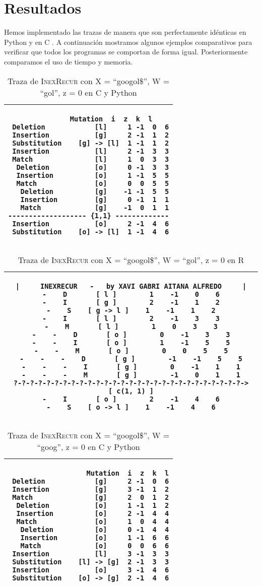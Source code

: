 \documentclass{article}
\newcommand{\tempcaption}{}
\newenvironment{code}[4]{
\begin{table}[h!]
\gdef\tempcaption{Traza de \textsc{InexRecur} con X = ``#1'', W = ``#2'', z = #3 en #4}
\centering
\begin{tabular}{|c|}
\hline }
{\\\hline
\end{tabular}
\caption{\tempcaption}
\end{table} }
\newcommand{\C}{C }
\newcommand{\R}{R }
\newcommand{\python}{Python }
\begin{document}
\section{Resultados}

Hemos implementado las trazas de manera que son perfectamente
idénticas en \python y en \C. A continuación mostramos algunos
ejemplos comparativos para verificar que todos los programas se
comportan de forma igual. Posteriormente comparamos el uso de
tiempo y memoria.
\\
\begin{code}{googol\$}{gol}{0}{\C y \python}
\begin{lstlisting}
		   Mutation  i  z  k  l
 Deletion            [l]     1 -1  0  6
 Insertion           [g]     2 -1  1  2
 Substitution    [g] -> [l]  1 -1  1  2
 Insertion           [l]     2 -1  3  3
 Match               [l]     1  0  3  3
  Deletion           [o]     0 -1  3  3
  Insertion          [o]     1 -1  5  5
  Match              [o]     0  0  5  5
   Deletion          [g]    -1 -1  5  5
   Insertion         [g]     0 -1  1  1
   Match             [g]    -1  0  1  1
------------------- {1,1} -------------
 Insertion           [o]     2 -1  4  6
 Substitution    [o] -> [l]  1 -1  4  6
\end{lstlisting}
\end{code}
\phantom{}
\vfill
\begin{code}{googol\$}{gol}{0}{\R}
\begin{lstlisting}
|     INEXRECUR   -   by XAVI GABRI AITANA ALFREDO     |
-    D       [ l ]        1    -1    0    6
-    I       [ g ]        2    -1    1    2
-    S    [ g -> l ]    1    -1    1    2
-    I       [ l ]        2    -1    3    3
-    M       [ l ]        1    0    3    3
-    -    D       [ o ]        0    -1    3    3
-    -    I       [ o ]        1    -1    5    5
-    -    M       [ o ]        0    0    5    5
-    -    -    D       [ g ]        -1    -1    5    5
-    -    -    I       [ g ]        0    -1    1    1
-    -    -    M       [ g ]        -1    0    1    1
?-?-?-?-?-?-?-?-?-?-?-?-?-?-?-?-?-?-?-?-?-?-?-?-?-?-?-?->  [ c(1, 1) ]
-    I       [ o ]        2    -1    4    6
-    S    [ o -> l ]    1    -1    4    6
\end{lstlisting}
\end{code}
\vfill
\clearpage
\phantom{}
\vspace{1cm}
\begin{code}{googol\$}{goog}{0}{\C y \python}
\begin{lstlisting}
                   Mutation  i  z  k  l
 Deletion            [g]     2 -1  0  6
 Insertion           [g]     3 -1  1  2
 Match               [g]     2  0  1  2
  Deletion           [o]     1 -1  1  2
  Insertion          [o]     2 -1  4  4
  Match              [o]     1  0  4  4
   Deletion          [o]     0 -1  4  4
   Insertion         [o]     1 -1  6  6
   Match             [o]     0  0  6  6
 Insertion           [l]     3 -1  3  3
 Substitution    [l] -> [g]  2 -1  3  3
 Insertion           [o]     3 -1  4  6
 Substitution    [o] -> [g]  2 -1  4  6
\end{lstlisting}
\end{code}
\end{document}
